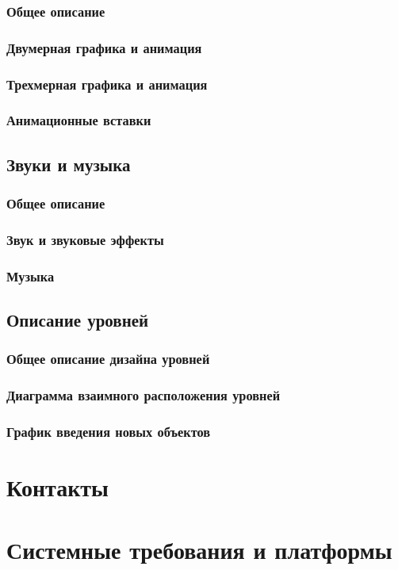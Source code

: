 \documentclass{article}
\begin{document}
\subsubsection{Общее описание}

\subsubsection{Двумерная графика и анимация}

\subsubsection{Трехмерная графика и анимация}

\subsubsection{Анимационные вставки}

\subsection{Звуки и музыка}

\subsubsection{Общее описание}

\subsubsection{Звук и звуковые эффекты}

\subsubsection{Музыка}

\subsection{Описание уровней}

\subsubsection{Общее описание дизайна уровней}

\subsubsection{Диаграмма взаимного расположения уровней}

\subsubsection{График введения новых объектов}

\section{Контакты}

\newpage

\section*{Системные требования и платформы}
\end{document}
